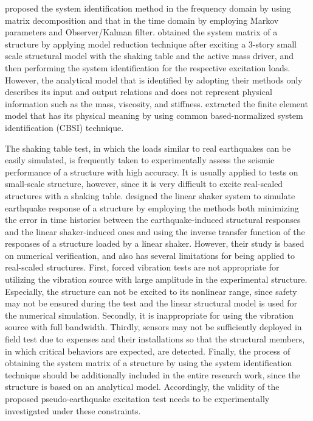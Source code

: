 \citet{juang1994applied} proposed the system identification method in the frequency domain by using matrix decomposition and that in the time domain by employing Markov parameters and Observer/Kalman filter\citep{juang1994applied}. \citet{dyke1994experimental} obtained the system matrix of a structure by applying model reduction technique after exciting a 3-story small scale structural model with the shaking table and the active mass driver, and then performing the system identification for the respective excitation loads. However, the analytical model that is identified by adopting their methods only describes its input and output relations and does not represent physical information such as the mass, viscosity, and stiffness\citep{dyke1994experimental}. \citet{alvin1994second} extracted the finite element model that has its physical meaning by using common based-normalized system identification (CBSI) technique\citep{alvin1994second}.

The shaking table test, in which the loads similar to real earthquakes can be easily simulated, is frequently taken to experimentally assess the seismic performance of a structure with high accuracy. It is usually applied to tests on small-scale structure, however, since it is very difficult to excite real-scaled structures with a shaking table. \citet{yu2005forced} designed the linear shaker system to simulate earthquake response of a structure by employing the methods both minimizing the error in time histories between the earthquake-induced structural responses and the linear shaker-induced ones and using the inverse transfer function of the responses of a structure loaded by a linear shaker\citep{yu2005forced}. However, their study is based on numerical verification, and also has several limitations for being applied to real-scaled structures. First, forced vibration tests are not appropriate for utilizing the vibration source with large amplitude in the experimental structure. Especially, the structure can not be excited to its nonlinear range, since safety may not be ensured during the test and the linear structural model is used for the numerical simulation. Secondly, it is inappropriate for using the vibration source with full bandwidth. Thirdly, sensors may not be sufficiently deployed in field test due to expenses and their installations so that the structural members, in which critical behaviors are expected, are detected. Finally, the process of obtaining the system matrix of a structure by using the system identification technique should be additionally included in the entire research work, since the structure is based on an analytical model. Accordingly, the validity of the proposed pseudo-earthquake excitation test needs to be experimentally investigated under these constraints. 

